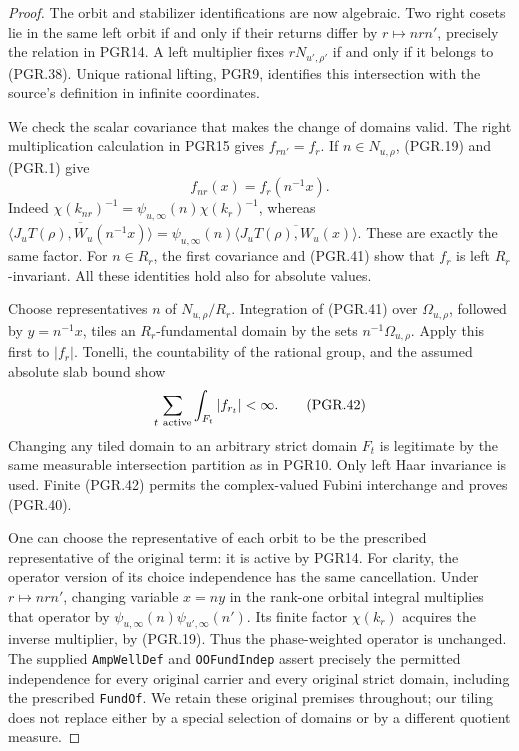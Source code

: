 \begin{proof}
The orbit and stabilizer identifications are now algebraic.
Two right cosets lie in the same left orbit if and only if
their returns differ by \(r\mapsto n r n'\), precisely the
relation in PGR14.  A left multiplier fixes \(rN_{u',\rho'}\)
if and only if it belongs to (PGR.38).  Unique rational lifting,
PGR9, identifies this intersection with the source's definition in
infinite coordinates.

We check the scalar covariance that makes the change of domains valid.
The right multiplication calculation in PGR15 gives
\(f_{rn'}=f_r\).  If \(n\in N_{u,\rho}\), (PGR.19)
and (PGR.1) give
\[
                  f_{nr}(x)=f_r(n^{-1}x).
\tag{PGR.41}
\]
Indeed \(\chi(k_{nr})^{-1}=\psi_{u,\infty}(n)
\chi(k_r)^{-1}\), whereas
\(\overline{\langle J_uT(\rho),W_u(n^{-1}x)\rangle}
=\psi_{u,\infty}(n)
\overline{\langle J_uT(\rho),W_u(x)\rangle}\).
These are exactly the same factor.  For \(n\in R_r\), the
first covariance and (PGR.41) show that \(f_r\) is left
\(R_r\)-invariant.  All these identities hold also for absolute
values.

Choose representatives \(n\) of \(N_{u,\rho}/R_r\).
Integration of (PGR.41) over \(\Omega_{u,\rho}\), followed by
\(y=n^{-1}x\), tiles an \(R_r\)-fundamental domain by the
sets \(n^{-1}\Omega_{u,\rho}\).  Apply this first to
\(|f_r|\).  Tonelli, the countability of the rational group, and
the assumed absolute slab bound show
\[
 \sum_{t\ {\rm active}}\int_{F_t}|f_{r_t}|<\infty.
\tag{PGR.42}
\]
Changing any tiled domain to an arbitrary strict domain \(F_t\)
is legitimate by the same measurable intersection partition as in
PGR10.  Only left Haar invariance is used.  Finite (PGR.42) permits
the complex-valued Fubini interchange and proves (PGR.40).

One can choose the representative of each orbit to be the prescribed
representative of the original term: it is active by PGR14.
For clarity, the operator version of its choice independence has the
same cancellation.  Under \(r\mapsto n r n'\), changing
variable \(x=ny\) in the rank-one orbital integral multiplies
that operator by
\(\psi_{u,\infty}(n)\psi_{u',\infty}(n')\).
Its finite factor \(\chi(k_r)\) acquires the inverse multiplier,
by (PGR.19).  Thus the phase-weighted operator is unchanged.
The supplied \texttt{AmpWellDef} and \texttt{OOFundIndep}
assert precisely the permitted independence for every original
carrier and every original strict domain, including the prescribed
\texttt{FundOf}.  We retain these original premises throughout;
our tiling does not replace either by a special selection of domains
or by a different quotient measure.
\end{proof}

